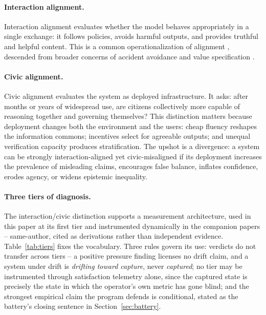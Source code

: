 \documentclass[11pt]{article}
\theoremstyle{definition}
\theoremstyle{remark}
\numberwithin{equation}{section}
\begin{document}
\paragraph{Interaction alignment.} Interaction alignment evaluates whether the model behaves appropriately in a single exchange: it follows policies, avoids harmful outputs, and provides truthful and helpful content. This is a common operationalization of alignment \citep{ouyang2022training, bai2022training, casper2023open}, descended from broader concerns of accident avoidance and value specification \citep{amodei2016concrete, gabriel2020artificial}.

\paragraph{Civic alignment.} Civic alignment evaluates the system as deployed infrastructure. It asks: after months or years of widespread use, are citizens collectively more capable of reasoning together and governing themselves? This distinction matters because deployment changes both the environment and the users: cheap fluency reshapes the information commons; incentives select for agreeable outputs; and unequal verification capacity produces stratification. The upshot is a divergence: a system can be strongly interaction-aligned yet civic-misaligned if its deployment increases the prevalence of misleading claims, encourages false balance, inflates confidence, erodes agency, or widens epistemic inequality.

\paragraph{Three tiers of diagnosis.} The interaction/civic distinction supports a measurement architecture, used in this paper at its first tier and instrumented dynamically in the companion papers -- same-author, cited as derivations rather than independent evidence. Table~\ref{tab:tiers} fixes the vocabulary. Three rules govern its use: verdicts do not transfer across tiers -- a positive pressure finding licenses no drift claim, and a system under drift is \emph{drifting toward capture}, never \emph{captured}; no tier may be instrumented through satisfaction telemetry alone, since the captured state is precisely the state in which the operator's own metric has gone blind; and the strongest empirical claim the program defends is conditional, stated as the battery's closing sentence in Section~\ref{sec:battery}.
\end{document}
